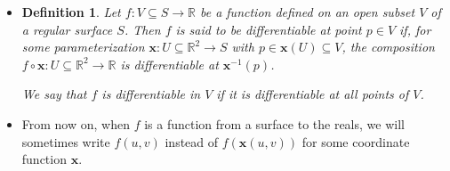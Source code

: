 \documentclass[10pt]{article}
\newtheorem{definition}[lemma]{Definition}
\newcommand{\ve}[1]{\mathbf{#1}}
\newcommand{\ra}{\rightarrow}
\newcommand{\Real}{\mathbb{R}}
\newcommand{\sseq}{\subseteq}
\begin{document}
\begin{itemize}
\begin{proof}
      Let $N = W \cap M$. Consider the function $F = \bar{\ve{x}}^{-1} \circ \ve{y}$ from $\ve{y}^{-1}(N) \ra \Real^3$. We have that $F$ is differentiable, and $\ve{y}^{-1}(N)$ contains $r$. Now, for all point $n \in N$, we have that $\bar{\ve{x}}^{-1}$ is of the form $(*,*,0)$ where the first two coordinates must agree with $\ve{x}^{-1}(n).$ Hence, in a neighborhood of $q$, we can say that $h = \pi \circ \bar{\ve{x}}^{-1} \circ \ve{y}$ where $\pi$ is the projection that drops the last component. Since $\pi$, $\bar{\ve{x}}$, and $\ve{y}$ are all differentiable, we have that $h$ is differentiable.
    \end{proof}

    \item \begin{definition}
      Let $f: V \sseq S \ra \Real$ be a function defined on an open subset $V$ of a regular surface $S$. Then $f$ is said to be differentiable at point $p \in V$ if, for some parameterization $\ve{x}: U \sseq \Real^2 \ra S$ with $p \in \ve{x}(U) \sseq V$, the composition $f \circ \ve{x}: U \sseq \Real^2 \ra \Real$ is differentiable at $\ve{x}^{-1}(p)$.

      We say that $f$ is differentiable in $V$ if it is differentiable at all points of $V$.
    \end{definition}

    \item From now on, when $f$ is a function from a surface to the reals, we will sometimes write $f(u,v)$ instead of $f(\ve{x}(u,v))$ for some coordinate function $\ve{x}$.  
  \end{itemize}
  
  
\end{document}

